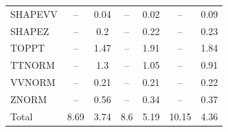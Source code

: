 \begin{table}[H]
\begin{center}
\begin{footnotesize}
\begin{tabular}{lcccccc}
				SHAPEVV & -- &  0.04 & -- &  0.02 & -- &  0.09 \\
				SHAPEZ & -- &  0.2 & -- &  0.22 & -- &  0.23 \\
				TOPPT & -- &  1.47 & -- &  1.91 & -- &  1.84 \\
				TTNORM & -- &  1.3 & -- &  1.05 & -- &  0.91 \\
				VVNORM & -- &  0.21 & -- &  0.21 & -- &  0.22 \\
				ZNORM & -- &  0.56 & -- &  0.34 & -- &  0.37 \\
				Total &  8.69  &  3.74 &  8.6  &  5.19 &  10.15  &  4.36 \\ \hline \hline
			\end{tabular}
			\label{tab:SysUncertainties_500}
        \end{footnotesize}
	\end{center}
\end{table}



